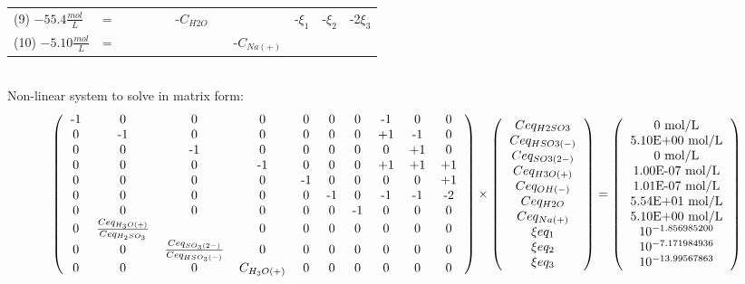 \documentclass[6pt,a4paper,oneside,preview]{standalone}
\begin{document}
\begin{landscape}
\begin{tabular}{llllllllllll}
(9) $-55.4 \frac{mol}{L}$  &= &  &  &  &  & -$C_{H2O}$  &  &  & -$\xi_1$ & -$\xi_2$ & -2$\xi_3$ \\
(10) $-5.10\frac{mol}{L}$ &= &  &  &  &  &  &  & -$C_{Na(+)}$ &  &  & \\
\end{tabular} 
\\
Non-linear system to solve in matrix form:
\\
\[
\left(
\begin{tabular}{cccccccccc}
-1 & 0 & 0 & 0 & 0 & 0 & 0 & -1 & 0 & 0 \\
0 & -1 & 0 & 0 & 0 & 0 & 0 & +1 & -1 & 0 \\
0 & 0 & -1 & 0 & 0 & 0 & 0 & 0 & +1 & 0 \\
0 & 0 & 0 & -1 & 0 & 0 & 0 & +1 & +1 & +1 \\
0 & 0 & 0 & 0 & -1 & 0 & 0 & 0 & 0 & +1 \\
0 & 0 & 0 & 0 & 0 & -1 & 0 & -1 & -1 & -2 \\
0 & 0 & 0 & 0 & 0 & 0 & -1 & 0 & 0 & 0 \\
0 & $\frac{Ceq_{H_3O(+)}}{Ceq_{H_2SO_3}}$ &  
& 0 & 0 & 0 & 0 & 0 & 0 & 0 \\
0 & 0 & $\frac{Ceq_{SO_3(2-)}}{Ceq_{HSO_3(-)}}$ & 
0 & 0 & 0 & 0 & 0 & 0 & 0\\
0 & 0 & 0 & $C_{H_3O(+)}$ & 0 & 0 & 0 & 0 & 0 & 0
\end{tabular}
\right)
\times
\left(
\begin{tabular}{c}
$Ceq_{H2SO3}$ \\
$Ceq_{HSO3(-)}$ \\
$Ceq_{SO3(2-)}$ \\
$Ceq_{H3O(+)}$ \\
$Ceq_{OH(-)}$ \\
$Ceq_{H2O}$ \\
$Ceq_{Na(+)}$ \\
$\xi eq_1$ \\
$\xi eq_2$ \\
$\xi eq_3$ \\
\end{tabular}
\right)
=
\left(
\begin{tabular}{c}
0 mol/L\\ 
5.10E+00 mol/L \\ 
0 mol/L \\ 
1.00E-07 mol/L \\ 
1.01E-07 mol/L \\ 
5.54E+01 mol/L \\ 
5.10E+00 mol/L \\ 
$10^{-1.856985200}$ \\
$10^{-7.171984936}$ \\
$10^{-13.99567863}$ \\
\end{tabular}
\right)
\]
\\ 
\end{landscape}
\end{document}
